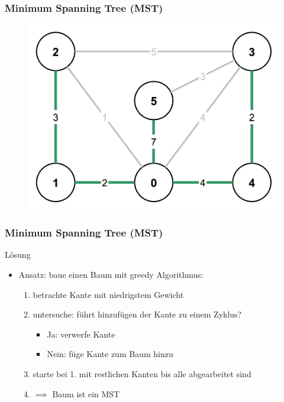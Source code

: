 \begin{frame}
\frametitle{Minimum Spanning Tree (MST)}
\begin{figure}
\includegraphics[width=0.75\linewidth]{kruskal_graphs/spanningtree2_weights.pdf}
\end{figure}
\end{frame}



\begin{frame}
\frametitle{Minimum Spanning Tree (MST)}
\begin{block}{Lösung}
\begin{itemize}
\item Ansatz: baue einen Baum mit greedy Algorithmus:
\begin{enumerate}
\item betrachte Kante mit niedrigstem Gewicht
\item untersuche: führt hinzufügen der Kante zu einem Zyklus?
\begin{itemize}
\item Ja: verwerfe Kante
\item Nein: füge Kante zum Baum hinzu
\end{itemize}
\item starte bei 1. mit restlichen Kanten bis alle abgearbeitet sind
\item $ \implies $ Baum ist ein MST
\end{enumerate}
\end{itemize}
\end{block}

\end{frame}

